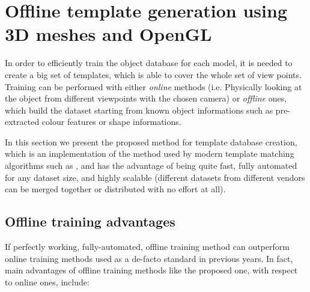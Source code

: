 \section{Offline template generation using 3D meshes and OpenGL} \label{sec:training}
In order to efficiently train the object database for each model, it is needed
to create a big set of templates, which is able to cover the whole set of view
points. Training can be performed with either \emph{online} methods (i.e.
Physically looking at the object from different viewpoints with the chosen
camera) or \emph{offline} ones, which build the dataset starting from known
object informations such as pre-extracted colour features or shape informations.

In this section we present the proposed method for template database
creation, which is an implementation of the method used by modern template
matching algorithms such as \cite{linemod-paper}, and
has the advantage of being quite fast, fully automated for any dataset size,
and highly scalable (different datasets from different vendors can be merged
together or distributed with no effort at all).

\subsection{Offline training advantages}
If perfectly working, fully-automated, offline training method can
outperform online training methods used as a de-facto standard
in previous years. In fact, main advantages of offline training methods like
the proposed one, with respect
to online ones, include:

